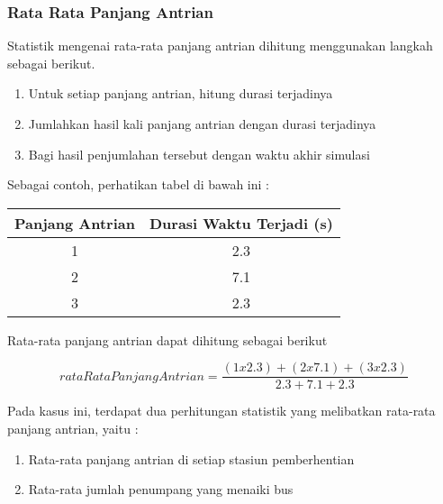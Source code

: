 \documentclass{article}
\begin{document}
\subsubsection{Rata Rata Panjang Antrian}
Statistik mengenai rata-rata panjang antrian dihitung menggunakan langkah sebagai berikut.
\begin{enumerate}
\item Untuk setiap panjang antrian, hitung durasi terjadinya
\item Jumlahkan hasil kali panjang antrian dengan durasi terjadinya
\item Bagi hasil penjumlahan tersebut dengan waktu akhir simulasi
\end{enumerate}
Sebagai contoh, perhatikan tabel di bawah ini :

\begin{center}
 \begin{tabular}{||c | c||} 
 \hline
 Panjang Antrian & Durasi Waktu Terjadi (s) \\ [0.5ex] 
 \hline\hline
 1 & 2.3 \\ 
 \hline
 2 & 7.1 \\
 \hline
 3 & 2.3 \\
 \hline
\end{tabular}
\end{center}

Rata-rata panjang antrian dapat dihitung sebagai berikut

$$ rataRataPanjangAntrian = \frac{(1x2.3) + (2x7.1) + (3 x 2.3)}{2.3 + 7.1 + 2.3}  $$

Pada kasus ini, terdapat dua perhitungan statistik yang melibatkan rata-rata panjang antrian, yaitu :
\begin{enumerate}
	\item Rata-rata panjang antrian di setiap stasiun pemberhentian
	\item Rata-rata jumlah penumpang yang menaiki bus
\end{enumerate}
\end{document}
